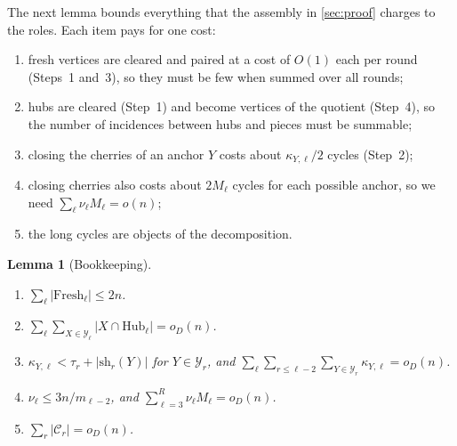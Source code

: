 \documentclass[11pt]{article}
\newtheorem{lemma}[theorem]{Lemma}
\theoremstyle{definition}
\theoremstyle{remark}
\numberwithin{equation}{section}
\numberwithin{figure}{section}
\numberwithin{table}{section}
\newcommand{\cC}{\mathcal{C}}
\newcommand{\cY}{\mathcal{Y}}
\newcommand{\Hub}{\mathrm{Hub}}
\newcommand{\Fresh}{\mathrm{Fresh}}
\newcommand{\sh}{\mathrm{sh}}
\newcommand{\oD}{o_D(n)}
\begin{document}
The next lemma bounds everything that the assembly in \cref{sec:proof} charges
to the roles. Each item pays for one cost:
\begin{enumerate}[label=\textup{(\alph*)},itemsep=1pt]
\item fresh vertices are cleared and paired at a cost of $O(1)$ each per round
(Steps~1 and~3), so they must be few when summed over all rounds;
\item hubs are cleared (Step~1) and become vertices of the quotient (Step~4),
so the number of incidences between hubs and pieces must be summable;
\item closing the cherries of an anchor $Y$ costs about $\kappa_{Y,\ell}/2$
cycles (Step~2);
\item closing cherries also costs about $2M_\ell$ cycles for each possible
anchor, so we need
$\sum_\ell\nu_\ell M_\ell=o(n)$;
\item the long cycles are objects of the decomposition.
\end{enumerate}

\begin{lemma}[Bookkeeping]\label{lem:bookkeeping}
\leavevmode
\begin{enumerate}[label=\textup{(\alph*)},itemsep=1pt]
\item\label{it:bk-fresh} $\sum_\ell|\Fresh_\ell|\le2n$.
\item\label{it:bk-hub} $\sum_\ell\sum_{X\in\cY_\ell}|X\cap\Hub_\ell|=\oD$.
\item\label{it:bk-crowd} $\kappa_{Y,\ell}<\tau_r+|\sh_r(Y)|$ for $Y\in\cY_r$, and
$\sum_{\ell}\sum_{r\le\ell-2}\sum_{Y\in\cY_r}\kappa_{Y,\ell}=\oD$.
\item\label{it:bk-anc} $\nu_\ell\le3n/m_{\ell-2}$, and
$\sum_{\ell=3}^R\nu_\ell M_\ell=\oD$.
\item\label{it:bk-cyc} $\sum_r|\cC_r|=\oD$.
\end{enumerate}
\end{lemma}
\end{document}
